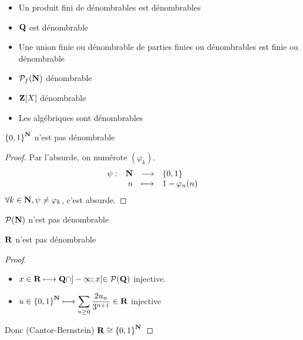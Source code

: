 \begin{cor}
\begin{itemize}
    \item Un produit fini de dénombrables est dénombrables
    \item $ \mathbf Q$ est dénombrable
    \item Une union finie ou dénombrable de parties finies ou dénombrables est finie ou dénombrable
    \item $\mathcal  P_f(\mathbf N)$ dénombrable
    \item $\mathbf Z[X]$ dénombrable
    \item Les algébriques sont dénombrables
\end{itemize}
\end{cor}

\begin{thm}
$\left\{ 0, 1 \right\} ^{\mathbf N}$ n'est pas dénombrable
\end{thm}

\begin{proof}
    Par l'absurde, on numérote $(\varphi_k)$.  \[
    \begin{array}{rrcl}
        \psi:&\mathbf N  & \longrightarrow & \left\{  0,1 \right\}  \\
             & n & \longmapsto & \displaystyle 1-\varphi_n(n)
    \end{array}
    \]
    $\forall  k \in  \mathbf N, \psi \neq \varphi_k$, c'est absurde.
\end{proof}

\begin{cor}
    $\mathcal  P(\mathbf N)$ n'est pas dénombrable
\end{cor}

\begin{thm}
$ \mathbf R$ n'est pas dénombrable
\end{thm}

\begin{proof}
\begin{itemize}
    \item $x \in  \mathbf R \longmapsto \mathbf Q\cap ]-\infty; x[ \in  \mathcal  P(\mathbf Q)$ injective.
    \item $\displaystyle u \in  \left\{  0,1 \right\} ^{\mathbf N} \longmapsto \sum_{n\geq 0}\frac{2u_n}{3^{n+1}} \in  \mathbf R$ injective
\end{itemize}
Donc (Cantor-Bernstein) $\mathbf R \cong \left\{ 0,1 \right\} ^{\mathbf N}$
\end{proof}
